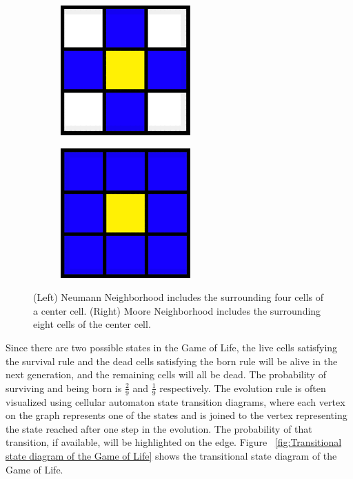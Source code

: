 \documentclass[12pt]{article}
\numberwithin{figure}{section} %
\begin{document}
\begin{figure}[H]
   \begin{subfigure}{0.48\textwidth}
     \centering
     \includegraphics[width=.6\linewidth]{Section1/1}
   \end{subfigure}\hfill
   \begin{subfigure}{0.48\textwidth}
     \centering
     \includegraphics[width=.6\linewidth]{Section1/2}
   \end{subfigure}
   \caption[Neighborhood configuration]{(Left) Neumann Neighborhood includes the surrounding four cells of a center cell. (Right) Moore Neighborhood includes the surrounding eight cells of the center cell.}
   \vspace{-1.5em}
   \label{fig:Neighborhood configuration}
\end{figure}

Since there are two possible states in the Game of Life, the live cells satisfying the survival rule and the dead cells satisfying the born rule will be alive in the next generation, and the remaining cells will all be dead. The probability of surviving and being born is $\frac{2}{9}$ and $\frac{1}{9}$ respectively. The evolution rule is often visualized using cellular automaton state transition diagrams, where each vertex on the graph represents one of the states and is joined to the vertex representing the state reached after one step in the evolution. The probability of that transition, if available, will be highlighted on the edge. Figure ~\ref{fig:Transitional state diagram of the Game of Life} shows the transitional state diagram of the Game of Life. 
\end{document}

